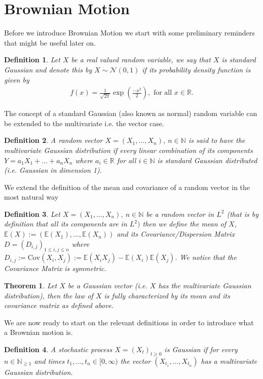\documentclass[11pt,a4paper, final]{article}
\newtheorem{thm}{Theorem}[section]
\newtheorem{defn}{Definition}[section]
\theoremstyle{definition}
\begin{document}
\section{Brownian Motion}
Before we introduce Brownian Motion we start with some preliminary reminders that might be useful later on. 
\begin{defn} Let $X$ be a real valued random variable, we say that $X$ is standard Gaussian and denote this by $X \sim \mathcal{N}(0,1)$ if its probability density function is given by 
\begin{align*}
f(x) = \frac{1}{\sqrt{2 \pi}} \exp \left( \frac{-x^2}{2} \right), \text{ for all } x \in \mathbb{R}.
\end{align*}
\end{defn}
\noindent The concept of a standard Gaussian (also known as normal) random variable can be extended to the multivariate i.e. the vector case. 
\begin{defn} A random vector $X=(X_1, \dots , X_n), \ n \in \mathbb{N}$ is said to have the multivariate Gaussian distribution if every linear combination of its components $Y=a_1 X_1 + \dots + a_n X_n$ where $a_i \in \mathbb{R}$ for all $i \in \mathbb{N}$ is standard Gaussian distributed (i.e. Gaussian in dimension 1). 
\end{defn}
\noindent We extend the definition of the mean and covariance of a random vector in the most natural way
\begin{defn} Let $X=(X_1, \dots , X_n), \ n \in \mathbb{N}$ be a random vector in $L^2$ (that is by definition that all its components are in $L^2)$ then we define the mean of $X$, $\mathbb{E}(X):= ( \mathbb{E}(X_1), \dots , \mathbb{E}(X_n))$ and its Covariance/Dispersion Matrix $D=(D_{i,j})_{1 \leq i,j \leq n }$ where $D_{i,j} := \text{Cov}(X_i, X_j) := \mathbb{E}(X_i X_j)- \mathbb{E}(X_i)\mathbb{E}(X_j)$. We notice that the Covariance Matrix is symmetric. 
\end{defn}
\begin{thm} Let $X$ be a Gaussian vector (i.e. $X$ has the multivariate Gaussian distribution), then the law of $X$ is fully characterized by its mean and its covariance matrix as defined above. 
\end{thm}
\noindent We are now ready to start on the relevant definitions in order to introduce what a Brownian motion is. 
\begin{defn} A stochastic process $X=(X_t)_{t \geq 0}$ is Gaussian if for every $n \in \mathbb{N}_{ \geq 1}$ and times $t_1, \dots , t_n  \in [0,  \infty)$ the vector $(X_{t_1}, \dots , X_{t_n})$ has a multivariate Gaussian distribution. 
\end{defn}
\end{document}
